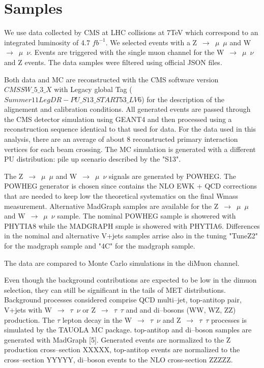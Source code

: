 \section{Samples}
\label{sec:sample}

We use data collected by CMS at LHC collisions at 7TeV which correspond to an integrated luminosity of 4.7 $fb^{-1}$.
We selected events with a Z~$\rightarrow$~$\mu$~$\mu$ and W~$\rightarrow$~$\mu$~$\nu$.
Events are triggered with the single muon channel for the W~$\rightarrow$~$\mu$~$\nu$ and Z events.
The data samples were filtered using official JSON files. 

Both data and MC are reconstructed with the CMS software
version $CMSSW\_5\_3\_X$ with Legacy global Tag ($Summer11LegDR-PU\_S13\_START53\_LV6$) for the description of the alignement and calibration conditions.
All generated events are passed through the CMS detector simulation using GEANT4 
and then processed using a reconstruction sequence identical to that used for data.
For the data used in this analysis, there are an average of about 8 reconstructed primary
interaction vertices for each beam crossing. The MC simulation is generated with a different
PU distribution: pile up scenario described by the "S13".

The Z~$\rightarrow$~$\mu$~$\mu$ and W~$\rightarrow$~$\mu$~$\nu$ signals are generated by POWHEG.
The POWHEG generator is chosen since contains the NLO EWK + QCD corrections that are needed to keep low the theoretical systematics on the final Wmass measurement.
Alternative MadGraph samples are available for the Z~$\rightarrow$~$\mu$~$\mu$ and W~$\rightarrow$~$\mu$~$\nu$ sample.
The nominal POWHEG sample is showered with PHYTIA8 while the MADGRAPH smple is showered with PHYTIA6.
Differences in the nominal and alternative V+jets samples arrise also in the tuning "TuneZ2" for the madgraph sample and "4C" for the madgraph sample.

The data are compared to Monte Carlo simulations in the diMuon channel.

Even though the background contributions are expected to be low in the dimuon selection, they can still be
significant in the tails of MET distributions. Background processes considered comprise 
QCD multi–jet, top-antitop pair, V+jets with W~$\rightarrow$~$\tau$~$\nu$ or Z~$\rightarrow$~$\tau$~$\tau$ and and di–bosons (WW, WZ, ZZ) production. 
The $\tau$ lepton decay in the W~$\rightarrow$~$\tau$~$\nu$ and Z~$\rightarrow$~$\tau$~$\tau$  processes is simulated by the TAUOLA MC package.
top-antitop and di–boson samples are generated with MadGraph [5]. 
Generated events are normalized to the Z production cross–section XXXXX,
top-antitop events are normalized to the cross–section YYYYY, di–boson events to the NLO cross-section ZZZZZ.


